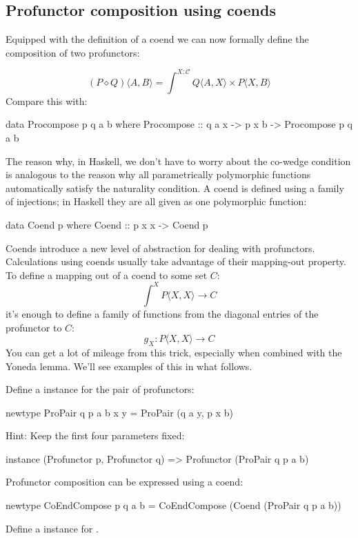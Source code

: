 \documentclass[DaoFP]{subfiles}
\begin{document}
\subsection{Profunctor composition using coends}

Equipped with the definition of a coend we can now formally define the composition of two profunctors:

\[ (P \diamond Q)\langle A, B \rangle = \int^{X\colon \mathcal{C}} Q \langle A, X \rangle \times P \langle X, B \rangle\]
Compare this with:
\begin{haskell}
data Procompose p q a b where
  Procompose ::  q a x -> p x b -> Procompose p q a b
\end{haskell}

The reason why, in Haskell, we don't have to worry about the co-wedge condition is analogous to the reason why all parametrically polymorphic functions automatically satisfy the naturality condition. A coend is defined using a family of injections; in Haskell they are all given as one polymorphic function:
\begin{haskell}
data Coend p where
  Coend ::  p x x -> Coend p
\end{haskell}

Coends introduce a new level of abstraction for dealing with profunctors. Calculations using coends usually take advantage of their mapping-out property. To define a mapping out of a coend to some set $C$:
\[ \int^X P \langle X, X \rangle \to C \]
 it's enough to define a family of functions from the diagonal entries of the profunctor to $C$:
 \[ g_X \colon P \langle X, X \rangle \to C \]
 You can get a lot of mileage from this trick, especially when combined with the Yoneda lemma. We'll see examples of this in what follows.

\begin{exercise}
Define a  instance for the pair of profunctors:
\begin{haskell}
newtype ProPair q p a b x y = ProPair (q a y, p x b)
\end{haskell}
Hint: Keep the first four parameters fixed:
\begin{haskell}
instance (Profunctor p, Profunctor q) => Profunctor (ProPair q p a b)
\end{haskell}
\end{exercise}

\begin{exercise}
Profunctor composition can be expressed using a coend:
\begin{haskell}
newtype CoEndCompose p q a b = CoEndCompose (Coend (ProPair q p a b))
\end{haskell}
Define a  instance for .
\end{exercise}
\end{document}
